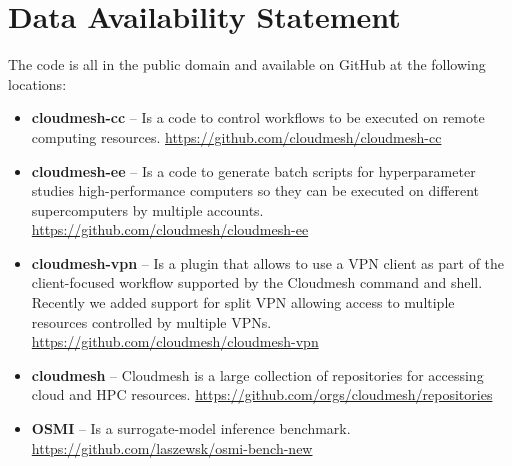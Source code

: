 \documentclass[sigconf]{acmart}
\begin{document}
\section*{Data Availability Statement}

The code is all in the public domain and available on GitHub at the following locations:

\begin{itemize}

\item {\bf cloudmesh-cc} -- Is a code to control workflows to be executed on
  remote computing
  resources. \url{https://github.com/cloudmesh/cloudmesh-cc}

\item {\bf cloudmesh-ee} -- Is a code to generate batch scripts for
  hyperparameter studies high-performance computers so they can be
  executed on different supercomputers by multiple
  accounts. \url{https://github.com/cloudmesh/cloudmesh-ee}


\item {\bf cloudmesh-vpn} -- Is a plugin that allows to use a VPN client as part of the client-focused workflow supported by the Cloudmesh command and shell. Recently we added support for split VPN allowing access to multiple resources controlled by multiple VPNs.
\url{https://github.com/cloudmesh/cloudmesh-vpn}

\item {\bf cloudmesh} -- Cloudmesh is a large collection of repositories for
  accessing cloud and HPC
  resources. \url{https://github.com/orgs/cloudmesh/repositories}

\item {\bf OSMI} -- Is a surrogate-model inference benchmark. \url{https://github.com/laszewsk/osmi-bench-new}



\end{itemize}
\end{document}
